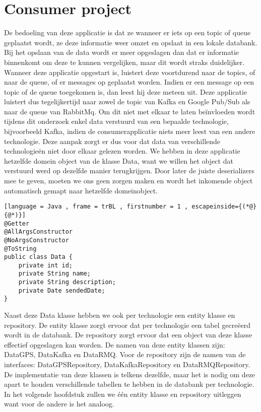 \section{Consumer project}
De bedoeling van deze applicatie is dat ze wanneer er iets op een topic of queue geplaatst wordt, ze deze informatie weer omzet en opslaat in een lokale databank. Bij het opslaan van de data wordt er meer opgeslagen dan dat er informatie binnenkomt om deze te kunnen vergelijken, maar dit wordt straks duidelijker. Wanneer deze applicatie opgestart is, luistert deze voortdurend naar de topics, of naar de queue, of er messages op geplaatst worden. Indien er een message op een topic of de queue toegekomen is, dan leest hij deze meteen uit. Deze applicatie luistert dus tegelijkertijd naar zowel de topic van Kafka en Google Pub/Sub als naar de queue van RabbitMq. Om dit niet met elkaar te laten beïnvloeden wordt tijdens dit onderzoek enkel data verstuurd van een bepaalde technologie, bijvoorbeeld Kafka, indien de consumerapplicatie niets meer leest van een andere technologie. Deze aanpak zorgt er dus voor dat data van verschillende technologieën niet door elkaar gelezen worden. We hebben in deze applicatie hetzelfde domein object van de klasse Data, want we willen het object dat verstuurd werd op dezelfde manier terugkrijgen. Door later de juiste deserializers mee te geven, moeten we ons geen zorgen maken en wordt het inkomende object automatisch gemapt naar hetzelfde domeinobject.
\begin{lstlisting}[language = Java , frame = trBL , firstnumber = 1 , escapeinside={(*@}{@*)}]
@Getter
@AllArgsConstructor
@NoArgsConstructor
@ToString
public class Data {
    private int id;
    private String name;
    private String description;
    private Date sendedDate;
}
\end{lstlisting}

Naast deze Data klasse hebben we ook per technologie een entity klasse en repository. De entity klasse zorgt ervoor dat per technologie een tabel gecreëerd wordt in de databank. De repository zorgt ervoor dat een object van deze klasse effectief opgeslagen kan worden. De namen van deze entity klassen zijn: DataGPS, DataKafka en DataRMQ. Voor de repository zijn de namen van de interfaces: DataGPSRepository, DataKafkaRepository en DataRMQRepository. De implementatie van deze klassen is telkens dezelfde, maar het is nodig om deze apart te houden verschillende tabellen te hebben in de databank per technologie. In het volgende hoofdstuk zullen we één entity klasse en repository uitleggen want voor de andere is het analoog.
